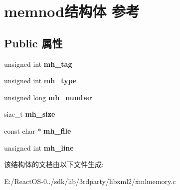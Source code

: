 \hypertarget{structmemnod}{}\section{memnod结构体 参考}
\label{structmemnod}
\subsection*{Public 属性}
\begin{DoxyCompactItemize}
\item 
\mbox{\label{structmemnod_a81b4b515be4f94e08b062fce633ff8eb}} 
unsigned int {\bfseries mh\+\_\+tag}
\item 
\mbox{\label{structmemnod_a3ff1672f505da28c2ddc6d684f601b82}} 
unsigned int {\bfseries mh\+\_\+type}
\item 
\mbox{\label{structmemnod_a30da7b53e926d3315300f419884c3f6b}} 
unsigned long {\bfseries mh\+\_\+number}
\item 
\mbox{\label{structmemnod_a9e6ad3432deb5bd3673a5630c7115736}} 
size\+\_\+t {\bfseries mh\+\_\+size}
\item 
\mbox{\label{structmemnod_a7d8d60ede78c8748c2b49804e3ff9baf}} 
const char $\ast$ {\bfseries mh\+\_\+file}
\item 
\mbox{\label{structmemnod_a7ec7067ebdc1ac7254c88d4faa3ed0fc}} 
unsigned int {\bfseries mh\+\_\+line}
\end{DoxyCompactItemize}


该结构体的文档由以下文件生成\+:\begin{DoxyCompactItemize}
\item 
E\+:/\+React\+O\+S-\/0../sdk/lib/3rdparty/libxml2/xmlmemory.\+c\end{DoxyCompactItemize}
